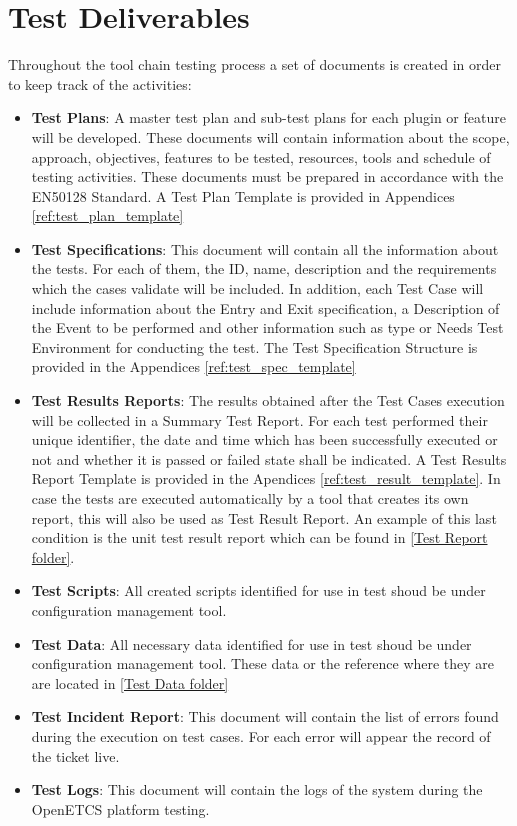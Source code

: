 \section{Test Deliverables}
Throughout the tool chain testing process a set of documents is created in order to keep track of the activities:
\begin{itemize}
\item \textbf{Test Plans}: A master test plan and sub-test plans for each plugin or feature will be developed. These documents will contain information about the scope, approach, objectives, features to be tested, resources, tools and schedule of testing activities.  These documents must be prepared in accordance with the EN50128 Standard. A Test Plan Template is provided in Appendices \ref{ref:test_plan_template}
\item \textbf{Test Specifications}: This document will contain all the information about the tests. For each of them, the ID, name, description and the requirements which the cases validate will be included. In addition, each Test Case will include information about the Entry and Exit specification, a Description of the Event to be performed and other information such as type or Needs Test Environment for conducting the test. The Test Specification Structure is provided in the Appendices \ref{ref:test_spec_template}
\item \textbf{Test Results Reports}: The results obtained after the Test Cases execution will be collected in a Summary Test Report. For each test performed their unique identifier, the date and time which has been successfully executed or not and whether it is passed or failed state shall be indicated. A Test Results Report Template is provided in the Apendices \ref{ref:test_result_template}. In case the tests are executed automatically by a tool that creates its own report, this will also be used as Test Result Report. An example of this last condition is the unit test result report which can be found in \href{https://openetcs.ci.cloudbees.com/job/openETCS-tycho/lastBuild/testReport/}{[Test Report folder]}.
\item \textbf{Test Scripts}: All created scripts identified for use in test shoud be under configuration management tool.
\item \textbf{Test Data}: All necessary data identified for use in test shoud be under configuration management tool. These data or the reference where they are are located in \href{https://github.com/openETCS/toolchain/tree/master/tool/bundles/Tests/Tests%20Data/}{[Test Data folder]}
\item \textbf{Test Incident Report}: This document will contain the list of errors found during the execution on test cases. For each error will appear the record of the ticket live.  
\item \textbf{Test Logs}: This document will contain the logs of the system during the OpenETCS platform testing.
\end{itemize}

